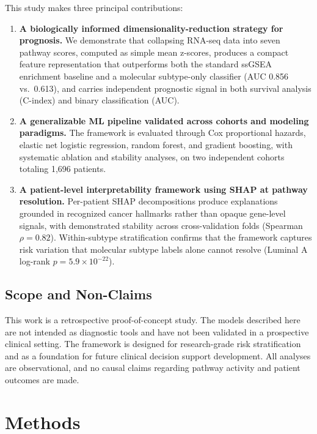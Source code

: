 \documentclass[journal]{IEEEtran}
\begin{document}
This study makes three principal contributions:
\begin{enumerate}
    \item \textbf{A biologically informed dimensionality-reduction strategy for prognosis.} We demonstrate that collapsing RNA-seq data into seven pathway scores, computed as simple mean z-scores, produces a compact feature representation that outperforms both the standard ssGSEA enrichment baseline and a molecular subtype-only classifier (AUC 0.856 vs.\ 0.613), and carries independent prognostic signal in both survival analysis (C-index) and binary classification (AUC).
    \item \textbf{A generalizable ML pipeline validated across cohorts and modeling paradigms.} The framework is evaluated through Cox proportional hazards, elastic net logistic regression, random forest, and gradient boosting, with systematic ablation and stability analyses, on two independent cohorts totaling 1,696 patients.
    \item \textbf{A patient-level interpretability framework using SHAP at pathway resolution.} Per-patient SHAP decompositions produce explanations grounded in recognized cancer hallmarks rather than opaque gene-level signals, with demonstrated stability across cross-validation folds (Spearman $\rho = 0.82$). Within-subtype stratification confirms that the framework captures risk variation that molecular subtype labels alone cannot resolve (Luminal A log-rank $p = 5.9 \times 10^{-22}$).
\end{enumerate}

\subsection{Scope and Non-Claims}

This work is a retrospective proof-of-concept study. The models described here are not intended as diagnostic tools and have not been validated in a prospective clinical setting. The framework is designed for research-grade risk stratification and as a foundation for future clinical decision support development. All analyses are observational, and no causal claims regarding pathway activity and patient outcomes are made.


\section{Methods}
\label{sec:methods}
\end{document}
